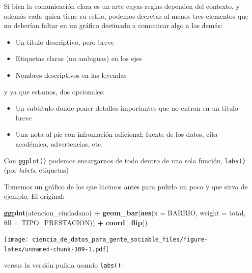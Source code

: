 \documentclass[]{book}
\newenvironment{Shaded}{\begin{snugshade}}{\end{snugshade}}
\newcommand{\KeywordTok}[1]{\textcolor[rgb]{0.13,0.29,0.53}{\textbf{#1}}}
\newcommand{\DataTypeTok}[1]{\textcolor[rgb]{0.13,0.29,0.53}{#1}}
\newcommand{\StringTok}[1]{\textcolor[rgb]{0.31,0.60,0.02}{#1}}
\newcommand{\OperatorTok}[1]{\textcolor[rgb]{0.81,0.36,0.00}{\textbf{#1}}}
\newcommand{\NormalTok}[1]{#1}
\providecommand{\tightlist}{%
  \setlength{\itemsep}{0pt}\setlength{\parskip}{0pt}}
\begin{document}
Si bien la comunicación clara es un arte cuyas reglas dependen del
contexto, y además cada quien tiene su estilo, podemos decretar al menos
tres elementos que no deberían faltar en un gráfico destinado a
comunicar algo a los demás:

\begin{itemize}
\tightlist
\item
  Un título descriptivo, pero breve
\item
  Etiquetas claras (no ambiguas) en los ejes
\item
  Nombres descriptivos en las leyendas
\end{itemize}

y ya que estamos, dos opcionales:

\begin{itemize}
\tightlist
\item
  Un subtítulo donde poner detalles importantes que no entran en un
  título breve
\item
  Una nota al pie con infromación adicional: fuente de los datos, cita
  académica, advertencias, etc.
\end{itemize}

Con \texttt{ggplot()} podemos encargarnos de todo dentro de una sola
función, \texttt{labs()} (por \emph{labels}, etiquetas)

Tomemos un gráfico de los que hicimos antes para pulirlo un poco y que
sirva de ejemplo. El original:

\begin{Shaded}
\begin{Highlighting}[]
\KeywordTok{ggplot}\NormalTok{(atencion_ciudadano) }\OperatorTok{+}
\StringTok{    }\KeywordTok{geom_bar}\NormalTok{(}\KeywordTok{aes}\NormalTok{(}\DataTypeTok{x =}\NormalTok{ BARRIO, }\DataTypeTok{weight =}\NormalTok{ total, }\DataTypeTok{fill =}\NormalTok{ TIPO_PRESTACION)) }\OperatorTok{+}
\StringTok{    }\KeywordTok{coord_flip}\NormalTok{()}
\end{Highlighting}
\end{Shaded}

\texttt{[image: ciencia\_de\_datos\_para\_gente\_sociable\_files/figure-latex/unnamed-chunk-109-1.pdf]}

versus la versión pulida usando \texttt{labs()}:
\end{document}
